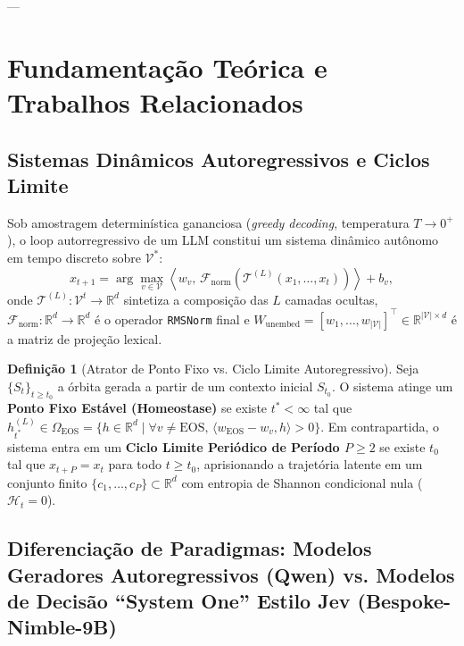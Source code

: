 \documentclass[11pt,a4paper]{article}
\theoremstyle{definition}
\newtheorem{definition}{Definição}
\begin{document}
---

\section{Fundamentação Teórica e Trabalhos Relacionados}

\subsection{Sistemas Dinâmicos Autoregressivos e Ciclos Limite}

Sob amostragem determinística gananciosa (\textit{greedy decoding}, temperatura $T \to 0^+$), o loop autorregressivo de um LLM constitui um sistema dinâmico autônomo em tempo discreto sobre $\mathcal{V}^*$:
\begin{equation}
    x_{t+1} = \arg\max_{v \in \mathcal{V}} \left\langle w_v,\, \mathcal{F}_{\text{norm}}\!\left(\mathcal{T}^{(L)}(x_1, \dots, x_t)\right) \right\rangle + b_v,
\end{equation}
onde $\mathcal{T}^{(L)}: \mathcal{V}^t \to \mathbb{R}^d$ sintetiza a composição das $L$ camadas ocultas, $\mathcal{F}_{\text{norm}}: \mathbb{R}^d \to \mathbb{R}^d$ é o operador \texttt{RMSNorm} final e $W_{\text{unembed}} = [w_1, \dots, w_{|\mathcal{V}|}]^\top \in \mathbb{R}^{|\mathcal{V}| \times d}$ é a matriz de projeção lexical.

\begin{definition}[Atrator de Ponto Fixo vs. Ciclo Limite Autoregressivo]
Seja $\{S_t\}_{t \ge t_0}$ a órbita gerada a partir de um contexto inicial $S_{t_0}$. O sistema atinge um \textbf{Ponto Fixo Estável (Homeostase)} se existe $t^* < \infty$ tal que $h_{t^*}^{(L)} \in \Omega_{\text{EOS}} = \{h \in \mathbb{R}^d \mid \forall v \neq \text{EOS},\, \langle w_{\text{EOS}} - w_v, h \rangle > 0\}$. Em contrapartida, o sistema entra em um \textbf{Ciclo Limite Periódico de Período $P \ge 2$} se existe $t_0$ tal que $x_{t+P} = x_t$ para todo $t \ge t_0$, aprisionando a trajetória latente em um conjunto finito $\{c_1, \dots, c_P\} \subset \mathbb{R}^d$ com entropia de Shannon condicional nula ($\mathcal{H}_t = 0$).
\end{definition}

\subsection{Diferenciação de Paradigmas: Modelos Geradores Autoregressivos (Qwen) vs. Modelos de Decisão ``System One'' Estilo Jev (Bespoke-Nimble-9B)}
\end{document}

